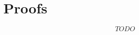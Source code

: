\documentclass{article}
\begin{document}
 







\clearpage 
\appendix

\onecolumn 
\section{Proofs}

$$ TODO $$
\end{document}
